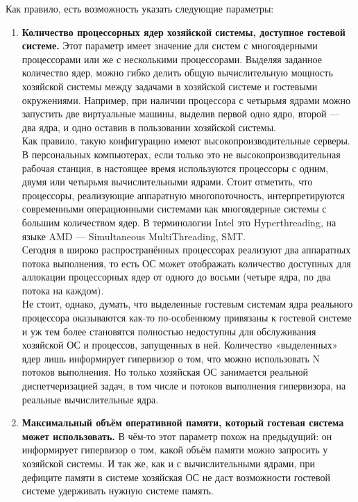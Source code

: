 \documentclass[14pt, a4paper]{article}
\begin{document}
Как правило, есть возможность указать следующие параметры:
\begin{enumerate}
    \item \textbf{Количество процессорных ядер хозяйской системы, доступное гостевой системе.} Этот
    параметр имеет значение для систем с многоядерными процессорами или же с несколькими
    процессорами. Выделяя заданное количество ядер, можно гибко делить общую
    вычислительную мощность хозяйской системы между задачами в хозяйской системе и
    гостевыми окружениями. Например, при наличии процессора с четырьмя ядрами можно
    запустить две виртуальные машины, выделив первой одно ядро, второй — два ядра, и одно
    оставив в пользовании хозяйской системы.\\

    Как правило, такую конфигурацию имеют высокопроизводительные серверы. В персональных
компьютерах, если только это не высокопроизводительная рабочая станция, в настоящее время
используются процессоры с одним, двумя или четырьмя вычислительными ядрами. Стоит отметить,
что процессоры, реализующие аппаратную многопоточность, интерпретируются современными
операционными системами как многоядерные системы с большим количеством ядер. В терминологии
Intel это Hyperthreading, на языке AMD — Simultaneous MultiThreading, SMT.\\

Сегодня в широко распространённых процессорах реализуют два аппаратных потока выполнения, то
есть ОС может отображать количество доступных для аллокации процессорных ядер от одного до
восьми (четыре ядра, по два потока на каждом).\\

Не стоит, однако, думать, что выделенные гостевым системам ядра реального процессора
оказываются как-то по-особенному привязаны к гостевой системе и уж тем более становятся
полностью недоступны для обслуживания хозяйской ОС и процессов, запущенных в ней. Количество
«выделенных» ядер лишь информирует гипервизор о том, что можно использовать N потоков
выполнения. Но только хозяйская ОС занимается реальной диспетчеризацией задач, в том числе и
потоков выполнения гипервизора, на реальные вычислительные ядра.
\item \textbf{Максимальный объём оперативной памяти, который гостевая система может
использовать.} В чём-то этот параметр похож на предыдущий: он информирует гипервизор о
том, какой объём памяти можно запросить у хозяйской системы. И так же, как и с
вычислительными ядрами, при дефиците памяти в системе хозяйская ОС не даст
возможности гостевой системе удерживать нужную системе память.\\


\end{enumerate}
\end{document}
